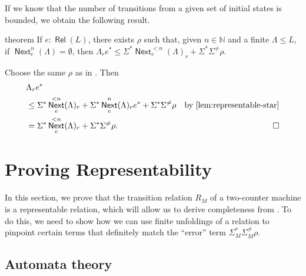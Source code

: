 \documentclass[11pt,a4paper]{amsart}
\theoremstyle{definition}
\DeclareMathOperator{\Next}{\mathsf{Next}}
\DeclareMathOperator{\Rel}{\mathsf{Rel}}
\begin{document}
If we know that the number of transitions from a given set of initial states is
bounded, we obtain the following result.

\begin{theoremEnd}{theorem}
  \label{thm:representable-star-finite}
  If $e : \Rel(L)$, there exists $ \rho $ such that, given $n  \in  \mathbb{N}$ and a finite
  $ \Lambda   \leq  L$, if $\Next_e^n( \Lambda ) =  \emptyset $, then
  \(  \Lambda _re^*  \leq   \Sigma ^*\Next_e^{< n}( \Lambda )_r +  \Sigma ^* \Sigma ^{ \neq } \rho . \)
\end{theoremEnd}

\begin{proofEnd} %
    Choose the same $ \rho $ as in .  Then
  \begin{align*}
    &  \Lambda _re^* \\
    &  \leq   \Sigma ^*\Next_e^{<n}( \Lambda )_r +  \Sigma ^*\Next_e^n( \Lambda )_re^* +  \Sigma ^* \Sigma ^{ \neq } \rho 
    & \text{by \Cref{lem:representable-star}} \\
    & =  \Sigma ^*\Next_e^{<n}( \Lambda )_r +  \Sigma ^* \Sigma ^{ \neq } \rho . & \qedhere
  \end{align*}
\end{proofEnd}

\section{Proving Representability}
\label{sec:proving-representability}

In this section, we prove that the transition relation $R_M$ of a two-counter
machine is a representable relation, which will allow us to derive completeness
from .  To do this, we need to show how we
can use finite unfoldings of a relation to pinpoint certain terms that
definitely match the ``error'' term $ \Sigma _M^* \Sigma _M^{ \neq } \rho $.

\subsection{Automata theory}
\label{sec:automata}
\end{document}
